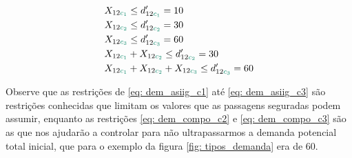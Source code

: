 \begin{align}
    & X_{12\textcolor[rgb]{0.0588, 0.5412, 0.4275}{c_1}} \leq d'_{12\textcolor[rgb]{0.0588, 0.5412, 0.4275}{c_1}} = 10                        \label{eq: dem_asiig_c1} \\
    & X_{12\textcolor[rgb]{0.0588, 0.5412, 0.4275}{c_2}} \leq d'_{12\textcolor[rgb]{0.0588, 0.5412, 0.4275}{c_2}} = 30                        \label{eq: dem_asiig_c2} \\
    & X_{12\textcolor[rgb]{0.0588, 0.5412, 0.4275}{c_3}} \leq d'_{12\textcolor[rgb]{0.0588, 0.5412, 0.4275}{c_3}} = 60                      \label{eq: dem_asiig_c3} \\
    & X_{12\textcolor[rgb]{0.0588, 0.5412, 0.4275}{c_1}} + X_{12\textcolor[rgb]{0.0588, 0.5412, 0.4275}{c_2}} \leq d'_{12\textcolor[rgb]{0.0588, 0.5412, 0.4275}{c_2}}  = 30           \label{eq: dem_compo_c2} \\
    & X_{12\textcolor[rgb]{0.0588, 0.5412, 0.4275}{c_1}} + X_{12\textcolor[rgb]{0.0588, 0.5412, 0.4275}{c_2}} + X_{12\textcolor[rgb]{0.0588, 0.5412, 0.4275}{c_3}} \leq d'_{12\textcolor[rgb]{0.0588, 0.5412, 0.4275}{c_3}} = 60 \label{eq: dem_compo_c3}                    
\end{align}

Observe que as restrições de \ref{eq: dem_asiig_c1} até \ref{eq: dem_asiig_c3} são restrições conhecidas que limitam os valores que as passagens seguradas podem assumir, enquanto as restrições \ref{eq: dem_compo_c2} e \ref{eq: dem_compo_c3} são as que nos ajudarão a controlar para não ultrapassarmos a demanda potencial total inicial, que para o exemplo da figura \ref{fig: tipos_demanda} era de 60.


























































